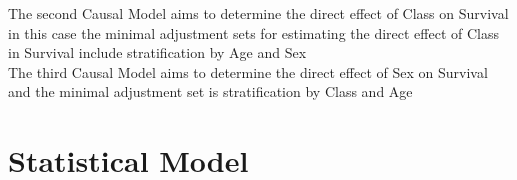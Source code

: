 \documentclass[12pt]{article}
\begin{document}
The second Causal Model aims to determine the direct effect of Class on Survival in this case the minimal adjustment sets for estimating the direct effect of Class in Survival include stratification by Age and Sex\\


The third Causal Model aims to determine the direct effect of Sex on Survival and the minimal adjustment set is stratification by Class and Age\\

\section{Statistical Model}
\end{document}
